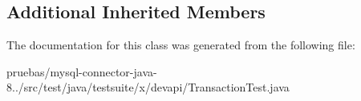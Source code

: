 \subsection*{Additional Inherited Members}


The documentation for this class was generated from the following file\+:\begin{DoxyCompactItemize}
\item 
pruebas/mysql-\/connector-\/java-\/8../src/test/java/testsuite/x/devapi/Transaction\+Test.\+java\end{DoxyCompactItemize}
